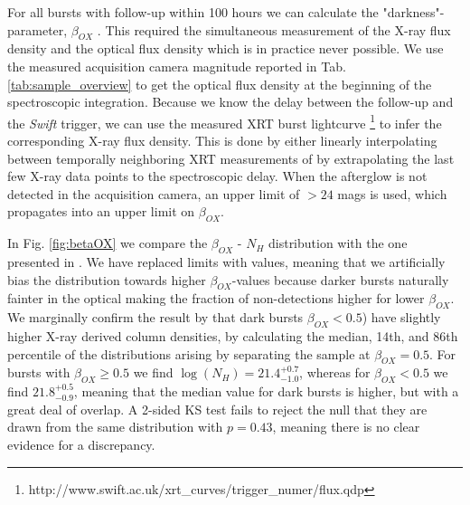 \documentclass{aa}    %
\begin{document}
For all bursts with follow-up within 100 hours we can calculate the
"darkness"-parameter, $\beta_{OX}$ \citep{Jakobsson2004, Milvang-Jensen2012}. This required the
simultaneous measurement of the X-ray flux density and the optical flux density
which is in practice never possible. We use the measured acquisition camera
magnitude reported in Tab. \ref{tab:sample_overview} to get the optical flux
density at the beginning of the spectroscopic integration. Because we know the
delay between the follow-up and the \textit{Swift} trigger, we can use the
measured XRT burst lightcurve \citep{Evans2007,
	Evans2009}\footnote{http://www.swift.ac.uk/xrt\_curves/trigger\_numer/flux.qdp}
to infer the corresponding X-ray flux density. This is done by either linearly
interpolating between temporally neighboring XRT measurements of by
extrapolating the last few X-ray data points to the spectroscopic delay. When
the afterglow is not detected in the acquisition camera, an upper limit of $> 24$
mags is used, which propagates into an upper limit on $\beta_{OX}$.

In Fig. \ref{fig:betaOX} we compare the $\beta_{OX}$ - $N_H$ distribution with
the one presented in \citet{Fynbo2009}. We have replaced limits with values,
meaning that we artificially bias the distribution towards higher
$\beta_{OX}$-values because darker bursts naturally fainter in the optical
making the fraction of non-detections higher for lower $\beta_{OX}$. We
marginally confirm the result by \citet{Fynbo2009} that dark bursts $\beta_{OX}
< 0.5$) have slightly higher X-ray derived column densities, by calculating the
median, 14th, and 86th percentile of the distributions arising by separating the
sample at $\beta_{OX} = 0.5$. For bursts with $\beta_{OX} \geq 0.5$ we find
$\log(N_H) = 21.4_{-1.0}^{+0.7}$, whereas for $\beta_{OX} < 0.5$ we find
$21.8_{-0.9}^{+0.5}$, meaning that the median value for dark bursts is higher,
but with a great deal of overlap. A 2-sided KS test fails to reject the null
that they are drawn from the same distribution with $p = 0.43$, meaning there is
no clear evidence for a discrepancy.
\end{document}
